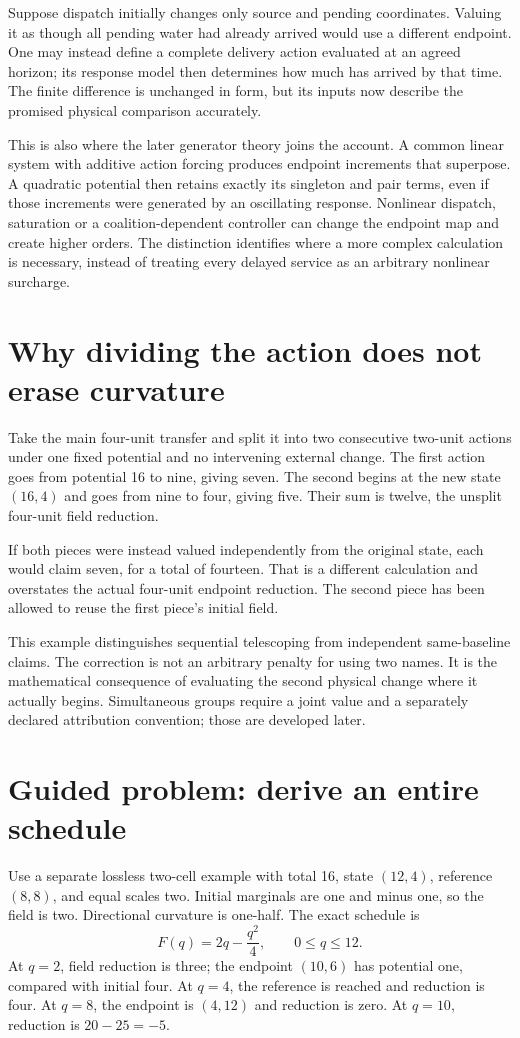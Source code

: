 Suppose dispatch initially changes only source and pending coordinates. Valuing it as though all pending water had already arrived would use a different endpoint. One may instead define a complete delivery action evaluated at an agreed horizon; its response model then determines how much has arrived by that time. The finite difference is unchanged in form, but its inputs now describe the promised physical comparison accurately.

This is also where the later generator theory joins the account. A common linear system with additive action forcing produces endpoint increments that superpose. A quadratic potential then retains exactly its singleton and pair terms, even if those increments were generated by an oscillating response. Nonlinear dispatch, saturation or a coalition-dependent controller can change the endpoint map and create higher orders. The distinction identifies where a more complex calculation is necessary, instead of treating every delayed service as an arbitrary nonlinear surcharge.

\section{Why dividing the action does not erase curvature}
Take the main four-unit transfer and split it into two consecutive two-unit actions under one fixed potential and no intervening external change. The first action goes from potential 16 to nine, giving seven. The second begins at the new state \((16,4)\) and goes from nine to four, giving five. Their sum is twelve, the unsplit four-unit field reduction.

If both pieces were instead valued independently from the original state, each would claim seven, for a total of fourteen. That is a different calculation and overstates the actual four-unit endpoint reduction. The second piece has been allowed to reuse the first piece's initial field.

This example distinguishes sequential telescoping from independent same-baseline claims. The correction is not an arbitrary penalty for using two names. It is the mathematical consequence of evaluating the second physical change where it actually begins. Simultaneous groups require a joint value and a separately declared attribution convention; those are developed later.

\section{Guided problem: derive an entire schedule}
Use a separate lossless two-cell example with total 16, state \((12,4)\), reference \((8,8)\), and equal scales two. Initial marginals are one and minus one, so the field is two. Directional curvature is one-half. The exact schedule is
\begin{equation}
 F(q)=2q-\frac{q^2}{4},\qquad 0\leq q\leq12.
\end{equation}
At \(q=2\), field reduction is three; the endpoint \((10,6)\) has potential one, compared with initial four. At \(q=4\), the reference is reached and reduction is four. At \(q=8\), the endpoint is \((4,12)\) and reduction is zero. At \(q=10\), reduction is \(20-25=-5\).

